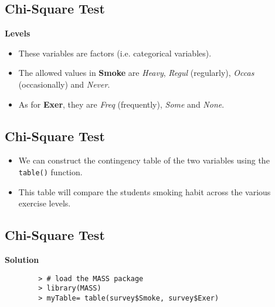 \documentclass[a4paper,12pt]{article}
\begin{document}
	
	\subsection{Chi-Square Test}
	
	\textbf{Levels}
	\begin{itemize}
		\item These variables are factors (i.e. categorical variables).
		\bigskip
		\item The allowed values in \textbf{Smoke} are \textit{Heavy}, \textit{Regul} (regularly), \textit{Occas} (occasionally) and \textit{Never}. 
		\bigskip
		\item As for \textbf{Exer}, they are \textit{Freq} (frequently), \textit{Some} and \textit{None}.
	\end{itemize}
	
	
	\subsection{Chi-Square Test}
	
	\begin{itemize}
		\item We can construct the contingency table of the two variables using the \texttt{table()} function.
		\bigskip
		\item This table will compare the students smoking habit across the various exercise levels. 
	\end{itemize}
	
	
	
	\subsection{Chi-Square Test}
	
	\textbf{Solution}
	\begin{framed}
		\begin{verbatim}
		> # load the MASS package 
		> library(MASS)       
		> myTable= table(survey$Smoke, survey$Exer) 
		\end{verbatim}
	\end{framed}
	
\end{document}
